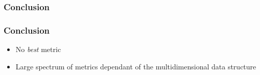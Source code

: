 
\begin{frame}
  \frametitle{Conclusion}
\end{frame}

\begin{frame}
  \frametitle{Conclusion}
  \begin{itemize}
    \item No \textit{best} metric
    \item Large spectrum of metrics dependant of the multidimensional data structure
  \end{itemize}
\end{frame}